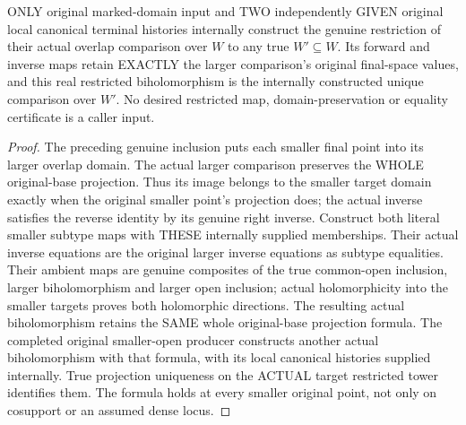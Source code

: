 \begin{theorem}
\label{hir:original-terminal-overlap-further-restriction-intrinsic-naturality}
\leanok
ONLY original marked-domain input and TWO independently GIVEN original
local canonical terminal histories internally construct the genuine
restriction of their actual overlap comparison over $W$ to any true
$W'\subseteq W$. Its forward and inverse maps retain EXACTLY the larger
comparison's original final-space values, and this real restricted
biholomorphism is the internally constructed unique comparison over $W'$.
No desired restricted map, domain-preservation or equality certificate
is a caller input.
\end{theorem}
\begin{proof}
The preceding genuine inclusion puts each smaller final point into its
larger overlap domain. The actual larger comparison preserves the WHOLE
original-base projection. Thus its image belongs to the smaller target
domain exactly when the original smaller point's projection does; the
actual inverse satisfies the reverse identity by its genuine right inverse.
Construct both literal smaller subtype maps with THESE internally supplied
memberships. Their actual inverse equations are the original larger inverse
equations as subtype equalities. Their ambient maps are genuine composites
of the true common-open inclusion, larger biholomorphism and larger open
inclusion; actual holomorphicity into the smaller targets proves both
holomorphic directions. The resulting actual biholomorphism retains the
SAME whole original-base projection formula. The completed original
smaller-open producer constructs another actual biholomorphism with that
formula, with its local canonical histories supplied internally. True
projection uniqueness on the ACTUAL target restricted tower identifies
them. The formula holds at every smaller original point, not only on
cosupport or an assumed dense locus.
\end{proof}


